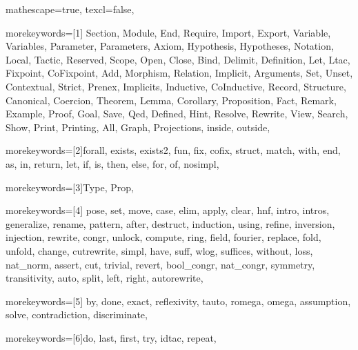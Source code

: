 
 {

mathescape=true,						
texcl=false,


morekeywords=[1]{
Section, Module, End, Require, Import, Export,
Variable, Variables, Parameter, Parameters, Axiom, Hypothesis, Hypotheses,
Notation, Local, Tactic, Reserved, Scope, Open, Close, Bind, Delimit,
Definition, Let, Ltac, Fixpoint, CoFixpoint, Add, Morphism, Relation,
Implicit, Arguments, Set, Unset, Contextual, Strict, Prenex, Implicits,
Inductive, CoInductive, Record, Structure, Canonical, Coercion,
Theorem, Lemma, Corollary, Proposition, Fact, Remark, Example,
Proof, Goal, Save, Qed, Defined, Hint, Resolve, Rewrite, View,
Search, Show, Print, Printing, All, Graph, Projections, inside, outside},

morekeywords=[2]{forall, exists, exists2, fun, fix, cofix, struct,
      match, with, end, as, in, return, let, if, is, then, else,
      for, of, nosimpl},

morekeywords=[3]{Type, Prop},

morekeywords=[4]{
         pose, set, move, case, elim, apply, clear,
            hnf, intro, intros, generalize, rename, pattern, after,
	    destruct, induction, using, refine, inversion, injection,
         rewrite, congr, unlock, compute, ring, field, fourier, 
            replace, fold, unfold, change, cutrewrite, simpl,
         have, suff, wlog, suffices, without, loss, nat_norm,
            assert, cut, trivial, revert, bool_congr, nat_congr,
	 symmetry, transitivity, auto, split, left, right, autorewrite},        

morekeywords=[5]{
         by, done, exact, reflexivity, tauto, romega, omega,
         assumption, solve, contradiction, discriminate},


morekeywords=[6]{do, last, first, try, idtac, repeat},


}
